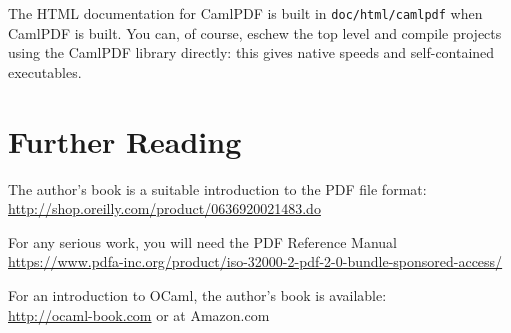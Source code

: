 \documentclass[a4paper]{memoir}
\newcommand{\smallgap}{\vspace{4mm}}
\begin{document}
\smallgap
\noindent The HTML documentation for CamlPDF is built in \texttt{doc/html/camlpdf} when \textsf{CamlPDF} is built. You can, of course, eschew the top level and compile projects using the CamlPDF library directly: this gives native speeds and self-contained executables.

\smallgap

\section*{Further Reading}
The author's book is a suitable introduction to the PDF file format:\\
\url{http://shop.oreilly.com/product/0636920021483.do}

\smallgap

\noindent For any serious work, you will need the PDF Reference Manual\\
\url{https://www.pdfa-inc.org/product/iso-32000-2-pdf-2-0-bundle-sponsored-access/}

\smallgap

\noindent For an introduction to OCaml, the author's book is available:\\
\url{http://ocaml-book.com} or at Amazon.com

\backmatter
\printindex
\end{document}
